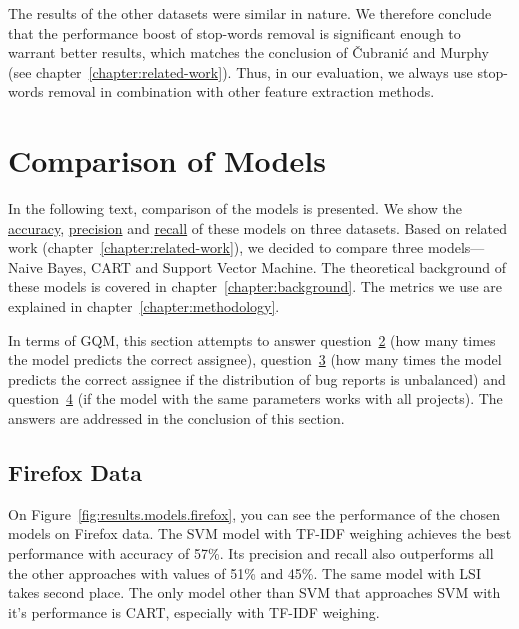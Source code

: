 The results of the other datasets were similar in nature. We therefore conclude that the performance boost of stop-words removal is significant enough to warrant better results, which matches the conclusion of Čubranić and Murphy~\cite{Murphy} (see chapter~\ref{chapter:related-work}). Thus, in our evaluation, we always use stop-words removal in combination with other feature extraction methods.

\section{Comparison of Models}

In the following text, comparison of the models is presented. We show the \hyperlink{metric:a}{accuracy}, \hyperlink{metric:p}{precision} and \hyperlink{metric:r}{recall} of these models on three datasets. Based on related work (chapter~\ref{chapter:related-work}), we decided to compare three models---Naive Bayes, CART and Support Vector Machine. The theoretical background of these models is covered in chapter~\ref{chapter:background}. The metrics we use are explained in chapter~\ref{chapter:methodology}.

In terms of GQM, this section attempts to answer question~\hyperlink{question:2}{2} (how many times the model predicts the correct assignee), question~\hyperlink{question:3}{3} (how many times the model predicts the correct assignee if the distribution of bug reports is unbalanced) and question~\hyperlink{question:4}{4} (if the model with the same parameters works with all projects). The answers are addressed in the conclusion of this section.

\subsection{Firefox Data}

On Figure~\ref{fig:results.models.firefox}, you can see the performance of the chosen models on Firefox data. The SVM model with TF-IDF weighing achieves the best performance with accuracy of 57\%. Its precision and recall also outperforms all the other approaches with values of 51\% and 45\%. The same model with LSI takes second place. The only model other than SVM that approaches SVM with it's performance is CART, especially with TF-IDF weighing.

